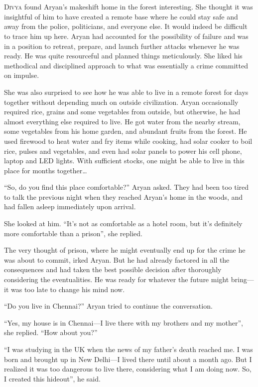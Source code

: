 \chapter{}

\lettrine{D}{ivya} found Aryan's makeshift home in the forest interesting. She
thought it was insightful of him to have created a remote base where he could
stay safe and away from the police, politicians, and everyone else. It would
indeed be difficult to trace him up here. Aryan had accounted for the
possibility of failure and was in a position to retreat, prepare, and launch
further attacks whenever he was ready.  He was quite resourceful and planned
things meticulously. She liked his methodical and disciplined approach to what
was essentially a crime committed on impulse.

She was also surprised to see how he was able to live in a remote forest for
days together without depending much on outside civilization. Aryan
occasionally required rice, grains and some vegetables from outside, but
otherwise, he had almost everything else required to live. He got
water from the nearby stream, some vegetables from his home garden, and
abundant fruits from the forest. He used firewood to heat water and fry items
while cooking, had solar cooker to boil rice, pulses and vegetables, and even
had solar panels to power his cell phone, laptop and LED lights. With sufficient
stocks, one might be able to live in this place for months together…

“So, do you find this place comfortable?” Aryan asked. They had been too tired
to talk the previous night when they reached Aryan's home in the woods, and had
fallen asleep immediately upon arrival.

She looked at him. “It's not as comfortable as a hotel room, but it's definitely more
comfortable than a prison”, she replied.

The very thought of prison, where he might eventually end up for the crime he was
about to commit, irked Aryan. But he had already factored in all the consequences and
had taken the best possible decision after thoroughly considering the eventualities.
He was ready for whatever the future might bring—it was too
late to change his mind now.

“Do you live in Chennai?” Aryan tried to continue the conversation.

“Yes, my house is in Chennai—I live there with my brothers and my mother”, she
replied. “How about you?”

“I was studying in the UK when the news of my father's death reached me. I was
born and brought up in New Delhi—I lived there until about a month ago. But I
realized it was too dangerous to live there, considering what I am doing now.
So, I created this hideout”, he said.

